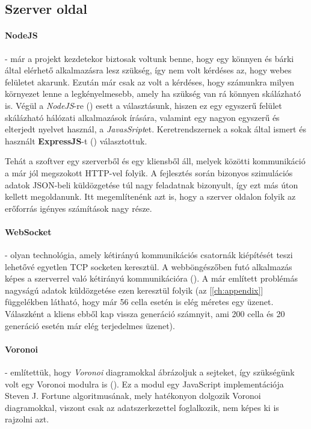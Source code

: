 \subsection{Szerver oldal}

\paragraph{NodeJS} - már a projekt kezdetekor biztosak voltunk benne, hogy egy könnyen és bárki által elérhető alkalmazásra lesz szükség, így nem volt kérdéses az, hogy webes felületet akarunk. Ezután már csak az volt a kérdéses, hogy számunkra milyen környezet lenne a legkényelmesebb, amely ha szükség van rá könnyen skálázható is. Végül a \textit{NodeJS}-re (\cite{soft:node}) esett a választásunk, hiszen ez egy egyszerű felület skálázható hálózati alkalmazások írására, valamint egy nagyon egyszerű és elterjedt nyelvet használ, a \textit{JavasSript}et. Keretrendszernek a sokak által ismert és használt \textbf{ExpressJS}-t (\cite{soft:express}) választottuk.

Tehát a szoftver egy szerverből és egy kliensből áll, melyek közötti kommunikáció a már jól megszokott HTTP-vel folyik. A fejlesztés során bizonyos szimulációs adatok JSON-beli küldözgetése túl nagy feladatnak bizonyult, így ezt más úton kellett megoldanunk. Itt megemlítenénk azt is, hogy a szerver oldalon folyik az erőforrás igényes számítások nagy része.

\paragraph{WebSocket} - olyan technológia, amely kétirányú kommunikációs csatornák kiépítését teszi lehetővé egyetlen TCP socketen keresztül. A webböngészőben futó alkalmazás képes a szerverrel való kétirányú kommunikációra (\cite{wiki:Websocket}). A már említett problémás nagyságú adatok küldözgetése ezen keresztül folyik (az [\ref{ch:appendix}] függelékben látható, hogy már 56 cella esetén is elég méretes egy üzenet. Válaszként a kliens ebből kap vissza generáció számnyit, ami 200 cella és 20 generáció esetén már elég terjedelmes üzenet).

\paragraph{Voronoi} - említettük, hogy \textit{Voronoi} diagramokkal ábrázoljuk a sejteket, így szükségünk volt egy Voronoi modulra is (\cite{soft:voronoiModule}). Ez a modul egy JavaScript implementációja Steven J. Fortune algoritmusának, mely hatékonyon dolgozik Voronoi diagramokkal, viszont csak az adatszerkezettel foglalkozik, nem képes ki is rajzolni azt.

